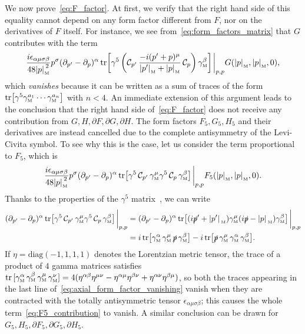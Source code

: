 \documentclass[a4paper, 11pt]{article}
\newcommand{\mnorm}[1]			
	{\abs*{#1}_{\! \scriptscriptstyle \mathrm{M}}}			%
\newcommand{\mink}{{\scriptscriptstyle{\mathrm{M}}}}		%
\newcommand{\mproj}[1]{\mathcal{C}_{#1}}					%
\theoremstyle{thm}
\begin{document}
We now prove~\eqref{eq:F_factor}. At first, we verify that the right hand side of this equality cannot depend on any form factor different from $F$, nor on the derivatives of $F$ itself. For instance, we see from~\eqref{eq:form_factors_matrix} that $G$ contributes with the term
\begin{equation}
\frac{i\epsilon_{\alpha \mu \sigma \beta}}{48 \mnorm{p}^2} p^\sigma (\partial_{p'} - \partial_p)^\alpha \tr[\gamma^5 \left( \mproj{p'} \, \frac{-i(p' + p)^\mu}{\mnorm{p'} + \mnorm{p}} \, \mproj{p} \right) \gamma^\beta_\mink] \eval_{p, p} G(\mnorm{p}, \mnorm{p}, 0),
\end{equation}
which \emph{vanishes} because it can be written as a sum of traces of the form $\tr[\gamma^5 \gamma^{a_1}_\mink \cdots \gamma^{a_n}_\mink]$ with $n < 4$. An immediate extension of this argument leads to the conclusion that the right hand side of~\eqref{eq:F_factor} does not receive any contribution from $G, H, \partial F, \partial G, \partial H$. The form factors $F_5, G_5, H_5$ and their derivatives are instead cancelled due to the complete antisymmetry of the Levi-Civita symbol. To see why this is the case, let us consider the term proportional to $F_5$, which is
\begin{equation}
\label{eq:F5_contribution}
\frac{i\epsilon_{\alpha \mu \sigma \beta}}{48 \mnorm{p}^2} p^\sigma (\partial_{p'} - \partial_p)^\alpha \tr[\gamma^5 \, \mproj{p'} \, \gamma^\mu_\mink \gamma^5 \, \mproj{p} \, \gamma^\beta_\mink] \eval_{p, p} F_5(\mnorm{p}, \mnorm{p}, 0).
\end{equation}
Thanks to the properties of the $\gamma^5$ matrix~\cite[Appendix ``Traces'']{Weinberg_1995}, we can write
\begin{align}
\label{eq:axial_form_factor_vanishing}
\begin{split}
(\partial_{p'} - \partial_p)^\alpha \tr[\gamma^5 \, \mproj{p'} \, \gamma^\mu_\mink \gamma^5 \, \mproj{p} \, \gamma^\beta_\mink] \eval_{p, p} 
& = (\partial_{p'} - \partial_p)^\alpha \tr[(i \slashed{p}' + \abs*{p'}_\mink) \gamma^\mu_\mink (i \slashed{p} - \abs*{p}_\mink) \gamma^\beta_\mink] \eval_{p, p}\\
& = i\tr[\gamma^\alpha_\mink \, \gamma^\mu_\mink \, \slashed{p} \, \gamma^\beta_\mink] -i\tr[\slashed{p} \, \gamma^\mu_\mink \, \gamma^\alpha_\mink \, \gamma^\beta_\mink].
\end{split}
\end{align}
If $\eta = \mathrm{diag} (-1, 1, 1, 1)$ denotes the Lorentzian metric tensor, the trace of a product of $4$ gamma matrices satisfies $\tr \, [\gamma^\alpha_\mink \, \gamma^\beta_\mink \, \gamma^\mu_\mink \, \gamma^\nu_\mink] = 4(\eta^{\alpha \beta} \eta^{\mu \nu} - \eta^{\alpha \mu} \eta^{\beta \nu} + \eta^{\alpha \nu} \eta^{\beta \mu})$, so both the traces appearing in the last line of~\eqref{eq:axial_form_factor_vanishing} vanish when they are contracted with the totally antisymmetric tensor $\epsilon_{\alpha \mu \sigma \beta}$; this causes the whole term~\eqref{eq:F5_contribution} to vanish. A similar conclusion can be drawn for $G_5, H_5, \partial F_5, \partial G_5, \partial H_5$.
\end{document}

